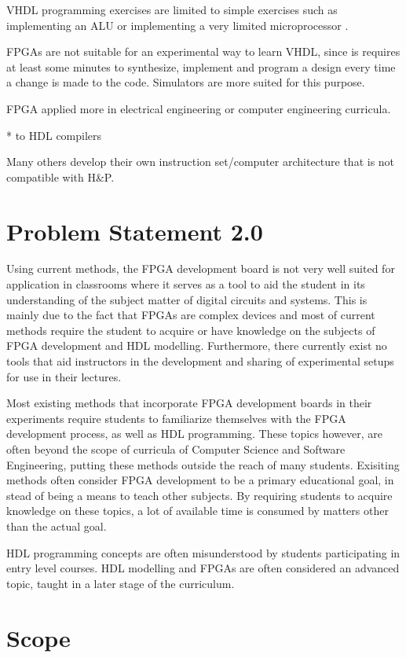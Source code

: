 \documentclass[openright]{uva-bachelor-thesis}
\begin{document}
VHDL programming exercises are limited to simple exercises such as implementing an ALU \cite{el2011teaching} or implementing a very limited microprocessor \cite{nativeFPGA}. 

FPGAs are not suitable for an experimental way to learn VHDL, since is requires at least some minutes to synthesize, implement and program a design every time a change is made to the code. Simulators are more suited for this purpose. 

FPGA applied more in electrical engineering or computer engineering curricula.

* to HDL compilers

Many others develop their own instruction set/computer architecture that is not compatible with H\&P.




\section{Problem Statement 2.0}
Using current methods, the FPGA development board is not very well suited for application in classrooms where it serves as a tool to aid the student in its understanding of the subject matter of digital circuits and systems. This is mainly due to the fact that FPGAs are complex devices and most of current methods require the student to acquire or have knowledge on the subjects of FPGA development and HDL modelling. Furthermore, there currently exist no tools that aid instructors in the development and sharing of experimental setups for use in their lectures. 

Most existing methods that incorporate FPGA development boards in their experiments require students to familiarize themselves with the FPGA development process, as well as HDL programming. These topics however, are often beyond the scope of curricula of Computer Science and Software Engineering, putting these methods outside the reach of many students. Exisiting methods often consider FPGA development to be a primary educational goal, in stead of being a means to teach other subjects. By requiring students to acquire knowledge on these topics, a lot of available time is consumed by matters other than the actual goal. 

HDL programming concepts are often misunderstood by students participating in entry level courses. HDL modelling and FPGAs are often considered an advanced topic, taught in a later stage of the curriculum. 


\section{Scope}
\end{document}
